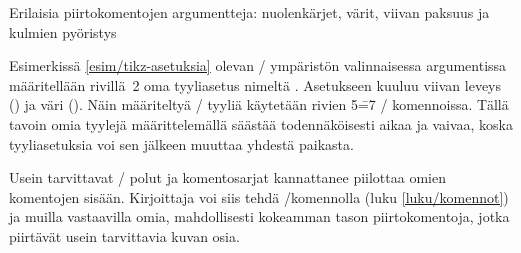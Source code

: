 \begin{esimerkki*}

\begin{koodilohko}
\end{koodilohko}

  \begin{tulos}
  \end{tulos}

\caption{Erilaisia piirtokomentojen argumentteja: nuolenkärjet, värit,
  viivan paksuus ja kulmien pyöristys}
\label{esim/tikz-asetuksia}
\end{esimerkki*}

Esimerkissä \ref{esim/tikz-asetuksia} olevan \-/
ympäristön valinnaisessa argumentissa määritellään rivillä~2 oma
tyyliasetus nimeltä . Asetukseen kuuluu viivan leveys
() ja väri (). Näin määriteltyä
\-/ tyyliä käytetään rivien 5\==7 \-/
komennoissa. Tällä tavoin omia tyylejä määrittelemällä säästää
todennäköisesti aikaa ja vaivaa, koska tyyliasetuksia voi sen jälkeen
muuttaa yhdestä paikasta.

Usein tarvittavat \-/ polut ja komentosarjat kannattanee
piilottaa omien komentojen sisään. Kirjoittaja voi siis tehdä
\-/komennolla (luku \ref{luku/komennot}) ja muilla
vastaavilla omia, mahdollisesti kokeamman tason piirtokomentoja, jotka
piirtävät usein tarvittavia kuvan osia.

